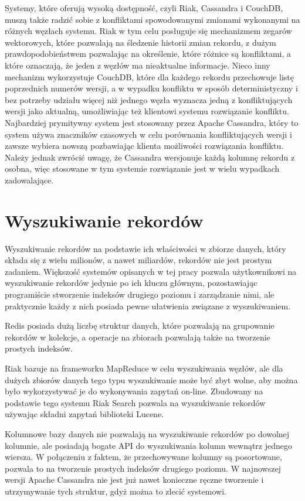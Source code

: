 Systemy, które oferują wysoką dostępność, czyli Riak, Cassandra i CouchDB, muszą także radzić sobie z konfliktami spowodowanymi zmianami wykonanymi na różnych węzłach systemu.
Riak w tym celu posługuje się mechanizmem zegarów wektorowych, które pozwalają na śledzenie historii zmian rekordu, z dużym prawdopodobieństwem pozwalając na określenie, które różnice są konfliktami, a które oznaczają, że jeden z węzłów ma nieaktualne informacje.
Nieco inny mechanizm wykorzystuje CouchDB, które dla każdego rekordu przechowuje listę poprzednich numerów wersji, a w wypadku konfliktu w sposób deterministyczny i bez potrzeby udziału więcej niż jednego węzła wyznacza jedną z konfliktujących wersji jako aktualną, umożliwiając też klientowi systemu rozwiązanie konfliktu.
Najbardziej prymitywny system jest stosowany przez Apache Cassandra, który to system używa znaczników czasowych w celu porównania konfliktujących wersji i zawsze wybiera nowszą pozbawiając klienta możliwości rozwiązania konfliktu.
Należy jednak zwrócić uwagę, że Cassandra wersjonuje każdą kolumnę rekordu z osobna, więc stosowane w tym systemie rozwiązanie jest w wielu wypadkach zadowalające.

\section{Wyszukiwanie rekordów}

Wyszukiwanie rekordów na podstawie ich właściwości w zbiorze danych, który składa się z wielu milionów, a nawet miliardów, rekordów nie jest prostym zadaniem.
Większość systemów opisanych w tej pracy pozwala użytkownikowi na wyszukiwanie rekordów jedynie po ich kluczu głównym, pozostawiając programiście stworzenie indeksów drugiego poziomu i zarządzanie nimi, ale praktycznie każdy z nich posiada pewne ułatwienia związane z wyszukiwaniem.

Redis posiada dużą liczbę struktur danych, które pozwalają na grupowanie rekordów w kolekcje, a operacje na zbiorach pozwalają także na tworzenie prostych indeksów.

Riak bazuje na frameworku MapReduce w celu wyszukiwania węzłów, ale dla dużych zbiorów danych tego typu wyszukiwanie może być zbyt wolne, aby można było wykorzystywać je do wykonywania zapytań on-line.
Zbudowany na podstawie tego systemu Riak Search pozwala na wyszukiwanie rekordów używając składni zapytań biblioteki Lucene.

Kolumnowe bazy danych nie pozwalają na wyszukiwanie rekordów po dowolnej kolumnie, ale posiadają bogate API do wyszukiwania kolumn wewnątrz jednego wiersza.
W połączeniu z faktem, że przechowywane kolumny są posortowane, pozwala to na tworzenie prostych indeksów drugiego poziomu.
W najnowszej wersji Apache Cassandra nie jest już nawet konieczne ręczne tworzenie i utrzymywanie tych struktur, gdyż można to zlecić systemowi.

